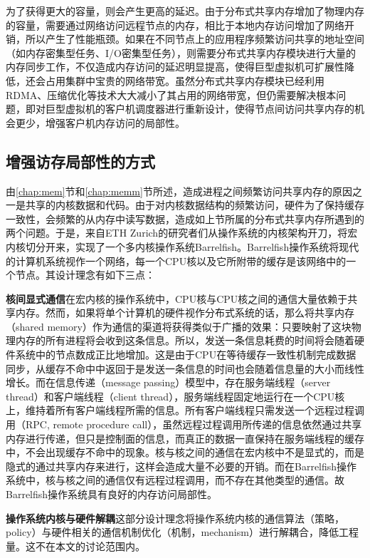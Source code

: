 为了获得更大的容量，则会产生更高的延迟。由于分布式共享内存增加了物理内存的容量，需要通过网络访问远程节点的内存，相比于本地内存访问增加了网络开销，所以产生了性能瓶颈。如果在不同节点上的应用程序频繁访问共享的地址空间（如内存密集型任务、I/O密集型任务），则需要分布式共享内存模块进行大量的内存同步工作，不仅造成内存访问的延迟明显提高，使得巨型虚拟机可扩展性降低，还会占用集群中宝贵的网络带宽。虽然分布式共享内存模块已经利用RDMA、压缩优化等技术大大减小了其占用的网络带宽，但仍需要解决根本问题，即对巨型虚拟机的客户机调度器进行重新设计，使得节点间访问共享内存的机会更少，增强客户机内存访问的局部性。
\subsection{增强访存局部性的方式}
由\ref{chap:mem}节和\ref{chap:memm}节所述，造成进程之间频繁访问共享内存的原因之一是共享的内核数据和代码。由于对内核数据结构的频繁访问，硬件为了保持缓存一致性，会频繁的从内存中读写数据，造成如上节所属的分布式共享内存所遇到的两个问题。于是，来自ETH Zurich的研究者们从操作系统的内核架构开刀，将宏内核切分开来，实现了一个多内核操作系统Barrelfish\cite{barrelfish}。Barrelfish操作系统将现代的计算机系统视作一个网络，每一个CPU核以及它所附带的缓存是该网络中的一个节点。其设计理念有如下三点：

\noindent\textbf{核间显式通信}\quad 在宏内核的操作系统中，CPU核与CPU核之间的通信大量依赖于共享内存。然而，如果将单个计算机的硬件视作分布式系统的话，那么将共享内存（shared memory）作为通信的渠道将获得类似于广播的效果：只要映射了这块物理内存的所有进程将会收到这条信息。所以，发送一条信息耗费的时间将会随着硬件系统中的节点数成正比地增加。这是由于CPU在等待缓存一致性机制完成数据同步，从缓存不命中中返回于是发送一条信息的时间也会随着信息量的大小而线性增长。而在信息传递（message passing）模型中，存在服务端线程（server thread）和客户端线程（client thread），服务端线程固定地运行在一个CPU核上，维持着所有客户端线程所需的信息。所有客户端线程只需发送一个远程过程调用（RPC, remote procedure call），虽然远程过程调用所传递的信息依然通过共享内存进行传递，但只是控制面的信息，而真正的数据一直保持在服务端线程的缓存中，不会出现缓存不命中的现象。核与核之间的通信在宏内核中不是显式的，而是隐式的通过共享内存来进行，这样会造成大量不必要的开销。而在Barrelfish操作系统中，核与核之间的通信仅有远程过程调用，而不存在其他类型的通信。故Barrelfish操作系统具有良好的内存访问局部性。

\noindent\textbf{操作系统内核与硬件解耦}\quad 这部分设计理念将操作系统内核的通信算法（策略，policy）与硬件相关的通信机制优化（机制，mechanism）进行解耦合，降低工程量。这不在本文的讨论范围内。

